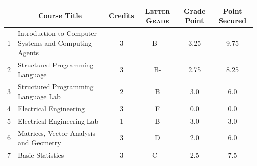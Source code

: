 \documentclass[11pt]{article}
\newcommand*{\numtwo}[1]{\pgfmathprintnumber[
                    fixed, precision=2, fixed zerofill=true]{#1}}
\begin{document}
                \begin{center}
                    \renewcommand{\arraystretch}{1.08}
                    
                \begin{tabular}{|c|l|c|>{\scshape}c|c|c|}
                \hline  \rule[-1ex]{0pt}{3.5ex} {\centering{\bf Course Code}} &  \multicolumn{1}{c|}{\textbf{Course Title}}  & {\bf Credits} & {\bf Letter Grade} & {\bf Grade Point} & {\bf Point Secured}  \\ 
                \hline   1 &  Introduction to Computer Systems and Computing Agents		 & 3 & B+ & 3.25 & 9.75 \\ %
                \hline   2 &  Structured Programming Language		 & 3 & B- & 2.75 & 8.25 \\ %
                \hline   3 &  Structured Programming Language Lab		 & 2 & B & 3.0 & 6.0 \\ %
                \hline   4 &  Electrical Engineering		 & 3 & F & 0.0 & 0.0 \\ %
                \hline   5 &  Electrical Engineering Lab		 & 1 & B & 3.0 & 3.0 \\ %
                \hline   6 &  Matrices, Vector Analysis and Geometry		 & 3 & D & 2.0 & 6.0 \\ %
                \hline   7 &  Basic Statistics		 & 3 & C+ & 2.5 & 7.5 \\ %

\hline                %
                \end{tabular}
                \end{center}
                \renewcommand{\arraystretch}{1.03}
\end{document}
